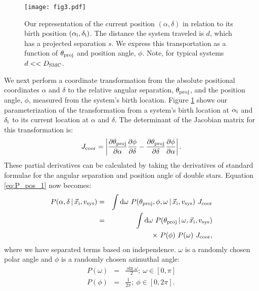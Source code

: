 \documentclass[usenatbib]{mnras}
\newcommand{\given}{\,|\,}
\newcommand{\dd}{\mathrm{d}}
\begin{document}
\begin{figure}
\begin{center}
\texttt{[image: fig3.pdf]}
\caption{Our representation of the current position $(\alpha, \delta)$ in relation to its birth position $(\alpha_{\rm i}, \delta_{\rm i})$. The distance the system traveled is $d$, which has a projected separation $s$. We express this transportation as a function of $\theta_{\rm proj}$ and position angle, $\phi$. Note, for typical systems $d << D_{\rm SMC}$.}
\label{fig:position_projection}
\end{center}
\end{figure}


We next perform a coordinate transformation from the absolute positional coordinates $\alpha$ and $\delta$ to the relative angular separation, $\theta_{\rm proj}$, and the position angle, $\phi$, measured from the system's birth location. Figure \ref{fig:position_projection} shows our parameterization of the transformation from a system's birth location at $\alpha_{\rm i}$ and $\delta_{\rm i}$ to its current location at $\alpha$ and $\delta$. The determinant of the Jacobian matrix for this transformation is:
\begin{equation}
J_{\rm coor} = \left| \frac{\partial \theta_{\rm proj}}{\partial \alpha} \frac{\partial \phi}{\partial \delta} - \frac{\partial \theta_{\rm proj}}{\partial \delta}\frac{\partial \phi}{\partial \alpha}  \right|.
\end{equation}
These partial derivatives can be calculated by taking the derivatives of standard formulae for the angular separation and position angle of double stars. Equation \ref{eq:P_pos_1} now becomes:
\begin{eqnarray}
P(\alpha, \delta \given \vec{x}_{\rm i}, v_{\rm sys} ) &=& \int \dd \omega\ P(\theta_{\rm proj}, \phi, \omega \given \vec{x}_{\rm i}, v_{\rm sys} )\ J_{\rm coor} \nonumber \\
&=& \int \dd \omega\ P(\theta_{\rm proj} \given \omega,  \vec{x}_{\rm i}, v_{\rm sys} ) \nonumber \\
& & \qquad \times\ P(\phi)\ P(\omega)\ J_{\rm coor}, \label{eq:P_pos_2}
\end{eqnarray}
where we have separated terms based on independence. $\omega$ is a randomly chosen polar angle and $\phi$ is a randomly chosen azimuthal angle: 
\begin{eqnarray}
P(\omega) &=& \frac{\sin \omega} {2};\ \omega \in [0,\pi] \\
P(\phi) &=& \frac{1}{2 \pi};\ \phi \in [0, 2\pi].
\end{eqnarray}
\end{document}
